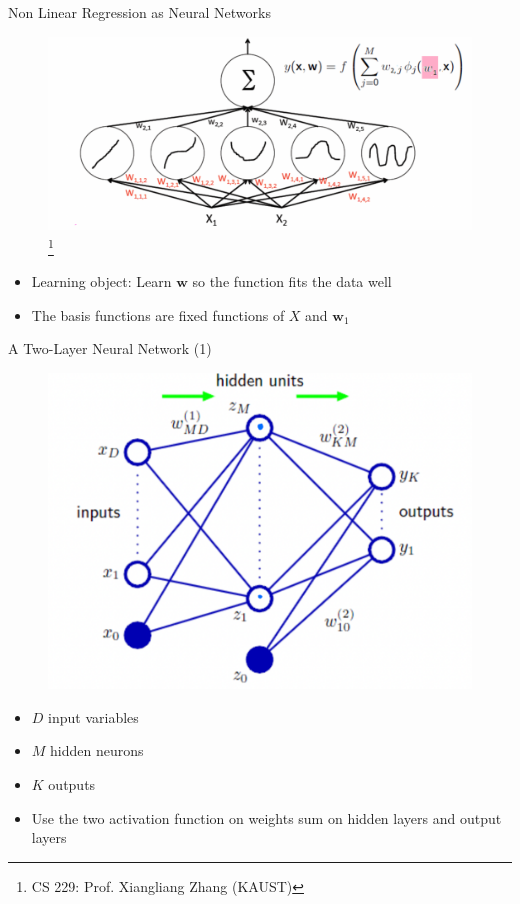 \documentclass[10pt, hyperref={colorlinks = true,linkcolor = blue}]{beamer}
\begin{document}
{{{\begin{frame}{Non Linear Regression as Neural Networks}
 \begin{figure}
 \includegraphics[width=0.7\linewidth]{figures/NN-NonLM.pdf} \footnote{CS 229: Prof. Xiangliang Zhang (KAUST)}
 \end{figure}
 \begin{itemize}
\item Learning object: Learn $\bm w$ so the function fits the data well
\item The basis functions are fixed functions of $X$ and $\bm w_1$
 \end{itemize}
\end{frame}

\begin{frame}{A Two-Layer Neural Network (1)}
\begin{figure}
\includegraphics[width=0.65\linewidth]{figures/TwoLayers.pdf}
\end{figure}
\begin{itemize}
\item $D$ input variables
\item $M$ hidden neurons 
\item $K$ outputs 
\item Use the two activation function on weights sum on hidden layers and output layers
\end{itemize}
\end{frame}
}

}}
\end{document}
